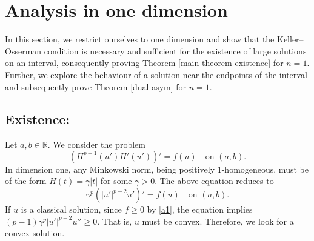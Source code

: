 \documentclass[11pt]{amsart}
\newcommand{\R}{\mathbb{R}}
\numberwithin{equation}{section}
\begin{document}
\section{Analysis in one dimension}\label{1d}
In this section, we restrict ourselves to one dimension and show that the Keller–Osserman condition is necessary and sufficient for the existence of large solutions on an interval, consequently proving Theorem \ref{main theorem existence} for $n=1$. Further, we explore the behaviour of a solution near the endpoints of the interval and subsequently prove Theorem \ref{dual asym} for $n=1$.

\subsection{Existence:}
Let $a,b\in \R$. We consider the problem 
\begin{equation}\label{eqn in one dim without boundary}
    \left(H^{p-1}(u')H'(u')\right)'=f(u)\quad \text{on } (a,b).
\end{equation}
In dimension one, any Minkowski norm, being positively 1-homogeneous, must be of the form $H(t)=\gamma |t|$ for some $\gamma>0$. The above equation reduces to  
\begin{equation}\label{eqn reduced in one dim}
    \gamma^{p}\left(|u'|^{p-2}u'\right)'=f(u)\quad \text{on }(a,b).
\end{equation}
If $u$ is a classical solution,
since $f\geq 0$ by \ref{a1}, the equation implies $(p-1)\gamma^{p}|u'|^{p-2}u''\geq 0$. That is,  $u$ must be convex. Therefore, we look for a convex solution.
\end{document}

